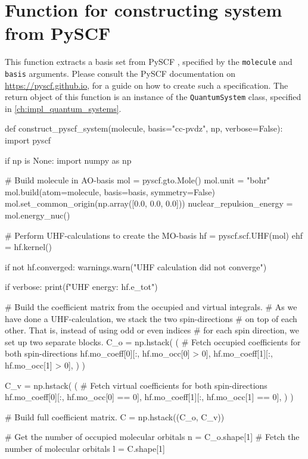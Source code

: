 \section{Function for constructing system from PySCF}
\label{sec:custom_system_pyscf}

This function extracts a basis set from PySCF \cite{PYSCF}, specified 
by the \lstinline{molecule} and \lstinline{basis} arguments.
Please consult the PySCF documentation on 
\url{https://pyscf.github.io}, for a guide on how to create such a specification.
The return object of this function is an instance of the
\lstinline{QuantumSystem} class, specified in
\autoref{ch:impl_quantum_systems}.

\begin{python}
def construct_pyscf_system(molecule, basis="cc-pvdz", np, verbose=False):
    import pyscf

    if np is None:
        import numpy as np

    # Build molecule in AO-basis
    mol = pyscf.gto.Mole()
    mol.unit = "bohr"
    mol.build(atom=molecule, basis=basis, symmetry=False)
    mol.set_common_origin(np.array([0.0, 0.0, 0.0]))
    nuclear_repulsion_energy = mol.energy_nuc()

    # Perform UHF-calculations to create the MO-basis
    hf = pyscf.scf.UHF(mol)
    ehf = hf.kernel()

    if not hf.converged:
        warnings.warn("UHF calculation did not converge")

    if verbose:
        print(f"UHF energy: {hf.e_tot}")

    # Build the coefficient matrix from the occupied and virtual integrals.
    # As we have done a UHF-calculation, we stack the two spin-directions 
    # on top of each other. That is, instead of using odd or even indices
    # for each spin direction, we set up two separate blocks.
    C_o = np.hstack(
        (
            # Fetch occupied coefficients for both spin-directions
            hf.mo_coeff[0][:, hf.mo_occ[0] > 0],
            hf.mo_coeff[1][:, hf.mo_occ[1] > 0],
        )
    )

    C_v = np.hstack(
        (
            # Fetch virtual coefficients for both spin-directions
            hf.mo_coeff[0][:, hf.mo_occ[0] == 0],
            hf.mo_coeff[1][:, hf.mo_occ[1] == 0],
        )
    )

    # Build full coefficient matrix.
    C = np.hstack((C_o, C_v))

    # Get the number of occupied molecular orbitals
    n = C_o.shape[1]
    # Fetch the number of molecular orbitals
    l = C.shape[1]


\end{python}
